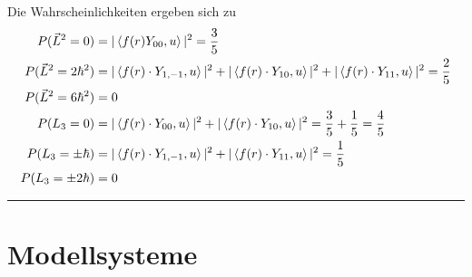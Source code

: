 \documentclass{article}
\begin{document}
{Die Wahrscheinlichkeiten ergeben sich zu
	\begin{align*}
		P(\vec{L}^2 = 0) &= |\braket{f(r) Y_{00}, u}|^2 = \frac{3}{5} \\
		P(\vec{L}^2 = 2\hbar^2) &= |\braket{f(r) \cdot Y_{1,-1}, u}|^2 + |\braket{f(r) \cdot Y_{10}, u}|^2 + |\braket{f(r) \cdot Y_{11}, u}|^2 = \frac{2}{5} \\
		P(\vec{L}^2 = 6\hbar^2) &= 0 \\
		P(L_3 = 0) &= |\braket{f(r) \cdot Y_{00}, u}|^2 + |\braket{f(r) \cdot Y_{10}, u}|^2 = \frac{3}{5} + \frac{1}{5} = \frac{4}{5} \\
		P(L_3 = \pm\hbar) &= |\braket{f(r) \cdot Y_{1,-1}, u}|^2 + |\braket{f(r) \cdot Y_{11}, u}|^2 = \frac{1}{5} \\
		P(L_3 = \pm 2\hbar) &= 0
	\end{align*}
\hrule
}


\newpage


\section{Modellsysteme}
\end{document}
